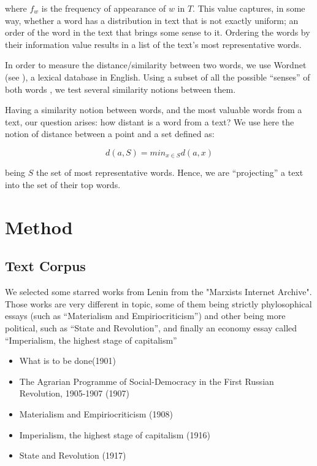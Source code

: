 \documentclass{pnastwo}
\begin{document}
\begin{article}
where $f_w$ is the frequency of appearance of $w$ in $T$. This value captures, in some way, whether a word
has a distribution in text that is not exactly uniform; an order of the word in the text that brings some sense to it. Ordering the words by their information value results in a list of the text's most representative words.

In order to measure the distance/similarity between two words, we use Wordnet (see \cite{WORDNET}), a lexical database in English. Using a subset of all the possible ``senses'' of both words , we test several similarity notions between them.

Having a similarity notion between words, and the most valuable words from a text, our question arises: how distant is a word from a text? We use here the notion of distance between a point and a set defined as:

\begin{equation}
  d(a, S) = min_{x \in S} d(a, x) 
\end{equation}

being $S$ the set of most representative words. Hence, we are ``projecting'' a text into the set of their top words. 

\section{Method}
\subsection{Text Corpus}
We selected some starred works from Lenin from the "Marxists Internet Archive". Those works are very different in topic, some of them being strictly phylosophical essays (such as ``Materialism and Empiriocriticism'') and other being more political, such as ``State and Revolution'', and finally an economy essay called ``Imperialism, the highest stage of capitalism''

\begin{itemize}
  \item What is to be done(1901)
  \item The Agrarian Programme of Social-Democracy in the First Russian Revolution, 1905-1907 (1907)
  \item Materialism and Empiriocriticism (1908)
  \item Imperialism, the highest stage of capitalism (1916)
  \item State and Revolution (1917)
\end{itemize}


\end{article}
\end{document}
